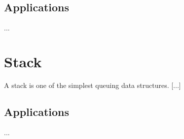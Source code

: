 
\subsection{Applications}
...

\section{Stack}
A stack is one of the simplest queuing data structures. [...]

\subsection{Applications}
...

